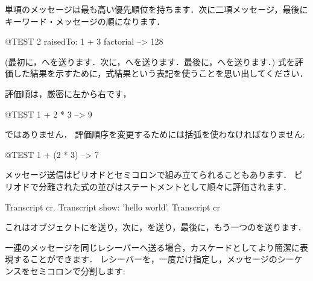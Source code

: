 \documentclass[a4paper,10pt,twoside]{book}
\begin{document}
単項のメッセージは最も高い優先順位を持ちます．次に二項メッセージ，最後にキーワード・メッセージの順になります．
\begin{code}{@TEST}
2 raisedTo: 1 + 3 factorial --> 128
\end{code}
(最初に，へを送ります．次に，へを送ります．最後に，へを送ります．)
式を評価した結果を示すために，式\ct{-->}結果という表記を使うことを思い出してください．

評価順は，厳密に左から右です，
\begin{code}{@TEST}
1 + 2 * 3 --> 9
\end{code}
ではありません．
評価順序を変更するためには括弧を使わなければなりません:
\begin{code}{@TEST}
1 + (2 * 3) --> 7
\end{code}

メッセージ送信はピリオドとセミコロンで組み立てられることもあります．
ピリオドで分離された式の並びはステートメントとして順々に評価されます．

\begin{code}{}
Transcript cr.
Transcript show: 'hello world'.
Transcript cr
\end{code}

\noindent
これはオブジェクトにを送り，次に，を送り，最後に，もう一つのを送ります．

一連のメッセージを同じレシーバーへ送る場合，カスケードとしてより簡潔に表現することができます．
レシーバーを，一度だけ指定し，メッセージのシーケンスをセミコロンで分割します:
\end{document}
